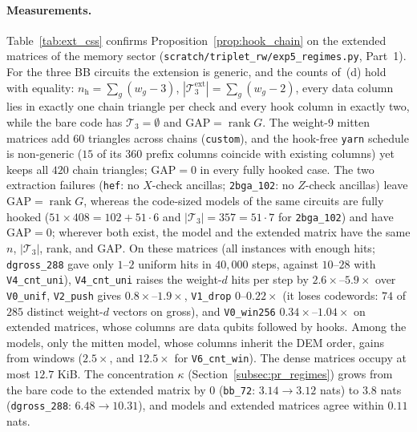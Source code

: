 \documentclass[12pt]{article}
\theoremstyle{definition}
\DeclareMathOperator{\rank}{rank}
\newcommand{\Tc}{\mathcal{T}_3}
\newcommand{\ttt}[1]{\texttt{#1}}
\begin{document}
\paragraph{Measurements.}
Table~\ref{tab:ext_css} confirms Proposition~\ref{prop:hook_chain} on the extended matrices of the memory sector
(\ttt{scratch/triplet\_rw/exp5\_regimes.py}, Part~1). For the three BB circuits the extension is generic, and the
counts of~(d) hold with equality: $n_{\mathrm{h}} = \sum_g (w_g - 3)$, $|\Tc^{\mathrm{ext}}| = \sum_g (w_g - 2)$, every
data column lies in exactly one chain triangle per check and every hook column in exactly two, while the bare code
has $\Tc = \emptyset$ and $\mathrm{GAP} = \rank G$. The weight-9 mitten matrices add $60$ triangles across chains
(\ttt{custom}), and the hook-free \ttt{yarn} schedule is non-generic ($15$ of its $360$ prefix columns coincide with
existing columns) yet keeps all $420$ chain triangles; $\mathrm{GAP} = 0$ in every fully hooked case. The two
extraction failures (\ttt{hef}: no $X$-check ancillas; \ttt{2bga\_102}: no $Z$-check ancillas) leave $\mathrm{GAP} =
\rank G$, whereas the code-sized models of the same circuits are fully hooked ($51 \times 408 = 102 + 51 \cdot 6$ and
$|\Tc| = 357 = 51 \cdot 7$ for \ttt{2bga\_102}) and have $\mathrm{GAP} = 0$; wherever both exist, the model and the
extended matrix have the same $n$, $|\Tc|$, rank, and $\mathrm{GAP}$. On these matrices (all instances with enough
hits; \ttt{dgross\_288} gave only $1$--$2$ uniform hits in $40{,}000$ steps, against $10$--$28$ with
\ttt{V4\_cnt\_uni}), \ttt{V4\_cnt\_uni} raises the weight-$d$ hits per step by $2.6\times$--$5.9\times$ over
\ttt{V0\_unif}, \ttt{V2\_push} gives $0.8\times$--$1.9\times$, \ttt{V1\_drop} $0$--$0.22\times$ (it loses codewords:
$74$ of $285$ distinct weight-$d$ vectors on gross), and \ttt{V0\_win256} $0.34\times$--$1.04\times$ on extended
matrices, whose columns are data qubits followed by hooks. Among the models, only the mitten model, whose columns
inherit the DEM order, gains from windows ($2.5\times$, and $12.5\times$ for \ttt{V6\_cnt\_win}). The dense matrices
occupy at most $12.7$ KiB. The concentration $\kappa$ (Section~\ref{subsec:pr_regimes}) grows from the bare code to
the extended matrix by $0$ (\ttt{bb\_72}: $3.14 \to 3.12$ nats) to $3.8$ nats (\ttt{dgross\_288}: $6.48 \to 10.31$),
and models and extended matrices agree within $0.11$ nats.
\end{document}
